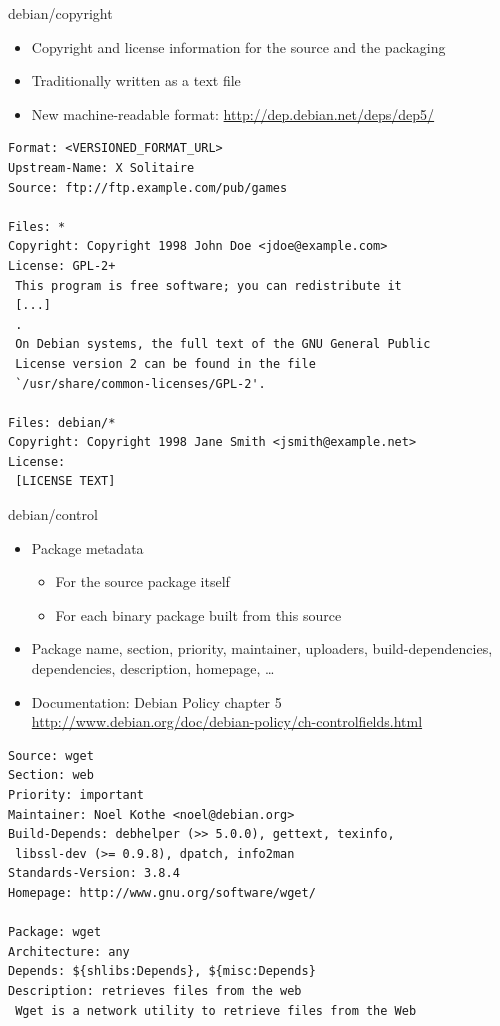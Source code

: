 \documentclass[10pt,final]{beamer}
\begin{document}
\begin{frame}[fragile]{debian/copyright}
  \hbr
  \begin{itemize}
  \item Copyright and license information for the source and the packaging
  \item Traditionally written as a text file
  \item New machine-readable format: \url{http://dep.debian.net/deps/dep5/}
  \end{itemize}
  \begin{lstlisting}[basicstyle=\ttfamily\footnotesize]
Format: <VERSIONED_FORMAT_URL>
Upstream-Name: X Solitaire
Source: ftp://ftp.example.com/pub/games

Files: *
Copyright: Copyright 1998 John Doe <jdoe@example.com>
License: GPL-2+
 This program is free software; you can redistribute it
 [...]
 .
 On Debian systems, the full text of the GNU General Public
 License version 2 can be found in the file
 `/usr/share/common-licenses/GPL-2'.

Files: debian/*
Copyright: Copyright 1998 Jane Smith <jsmith@example.net>
License:
 [LICENSE TEXT]
\end{lstlisting}
\end{frame}

\begin{frame}[fragile]{debian/control}
  \hbr
  \begin{itemize}
  \item Package metadata
    \begin{itemize}
    \item For the source package itself
    \item For each binary package built from this source
    \end{itemize}
    \hbr
  \item Package name, section, priority, maintainer, uploaders,
    build-dependencies, dependencies, description, homepage, \ldots \hbr
  \item Documentation: Debian Policy chapter 5\\
    \url{http://www.debian.org/doc/debian-policy/ch-controlfields.html}
  \end{itemize}
\begin{lstlisting}[basicstyle=\ttfamily\footnotesize]
Source: wget
Section: web
Priority: important
Maintainer: Noel Kothe <noel@debian.org>
Build-Depends: debhelper (>> 5.0.0), gettext, texinfo,
 libssl-dev (>= 0.9.8), dpatch, info2man
Standards-Version: 3.8.4
Homepage: http://www.gnu.org/software/wget/

Package: wget
Architecture: any
Depends: ${shlibs:Depends}, ${misc:Depends}
Description: retrieves files from the web
 Wget is a network utility to retrieve files from the Web
\end{lstlisting}
\end{frame}
\end{document}
